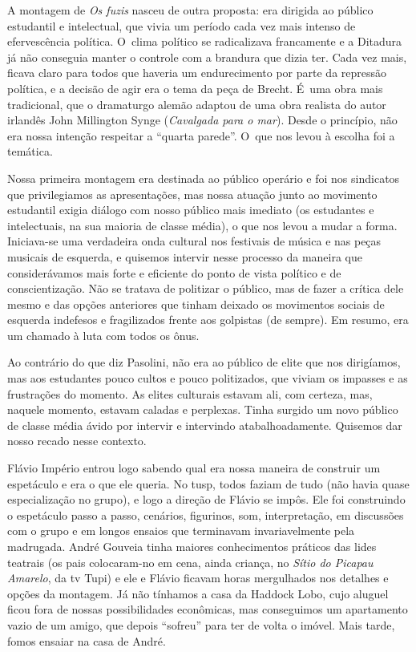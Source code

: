\subject{Montagem de Os fuzis de Tereza Carrar}

A montagem de {\it Os fuzis} nasceu de outra proposta: era dirigida ao
público estudantil e intelectual, que vivia um período cada vez mais
intenso de efervescência política. O~clima político se radicalizava
francamente e a Ditadura já não conseguia manter o controle com a
brandura que dizia ter. Cada vez mais, ficava claro para todos que
haveria um endurecimento por parte da repressão política, e a decisão de
agir era o tema da peça de Brecht. É~uma obra mais tradicional, que
o dramaturgo alemão adaptou de uma obra realista do autor irlandês John
Millington Synge ({\it Cavalgada para o mar}). Desde o princípio, não
era nossa intenção respeitar a “quarta parede”. O~que nos levou à
escolha foi a temática.

Nossa primeira montagem era destinada ao público operário e foi nos
sindicatos que privilegiamos as apresentações, mas nossa atuação junto ao
movimento estudantil exigia diálogo com nosso público mais
imediato (os estudantes e intelectuais, na sua maioria de classe média),
o que nos levou a mudar a forma. Iniciava-se
uma verdadeira onda cultural nos festivais de música e nas peças musicais
de esquerda, e quisemos intervir nesse processo da maneira que
considerávamos mais forte e eficiente do ponto de vista político e de
conscientização. Não se tratava de politizar o público, mas de fazer a
crítica dele mesmo e das opções anteriores que tinham deixado os
movimentos sociais de esquerda indefesos e fragilizados frente aos
golpistas (de sempre). Em resumo, era um chamado à luta com todos os
ônus.

Ao contrário do que diz Pasolini, não era ao público de elite que nos
dirigíamos, mas aos estudantes pouco cultos e pouco politizados, que
viviam os impasses e as frustrações do momento. As elites culturais
estavam ali, com certeza, mas, naquele momento, estavam caladas e perplexas.
Tinha surgido um novo público de classe média ávido por intervir e
intervindo atabalhoadamente. Quisemos dar nosso recado nesse contexto.

Flávio Império entrou logo sabendo qual era nossa maneira de construir
um espetáculo e era o que ele queria. No {\sc tusp}, todos faziam de tudo (não
havia quase especialização no grupo), e logo a direção de Flávio se
impôs. Ele foi construindo o espetáculo passo a passo, cenários, figurinos, som, interpretação, em discussões com o grupo e em longos ensaios que
terminavam invariavelmente pela madrugada. André Gouveia tinha maiores
conhecimentos práticos das lides teatrais (os pais colocaram-no em cena, ainda criança, no {\it Sítio do Picapau Amarelo}, da {\sc tv} Tupi) e ele e
Flávio ficavam horas mergulhados nos detalhes e opções da montagem. Já
não tínhamos a casa da Haddock Lobo, cujo aluguel ficou fora de nossas
possibilidades econômicas, mas conseguimos um apartamento vazio de um
amigo, que depois “sofreu” para ter de volta o imóvel. Mais tarde, fomos
ensaiar na casa de André.

